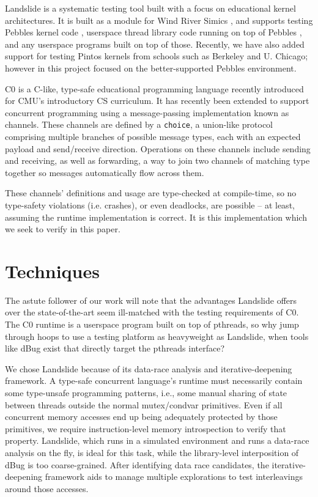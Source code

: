 \documentclass{article}
\begin{document}
Landslide \cite{landslide} is a systematic testing tool built with a focus on educational kernel architectures.
It is built as a module for Wind River Simics \cite{simics}, and supports testing Pebbles kernel code \cite{kspec}, userspace thread library code running on top of Pebbles \cite{thrlib}, and any userspace programs built on top of those.
Recently, we have also added support for testing Pintos kernels \cite{pintos} from schools such as Berkeley and U. Chicago; however in this project focused on the better-supported Pebbles environment.

C0 \cite{c0} is a C-like, type-safe educational programming language recently introduced for CMU's introductory CS curriculum.
It has recently been extended to support concurrent programming using a message-passing implementation known as channels.
These channels are defined by a {\tt choice}, a union-like protocol comprising multiple branches of possible message types, each with an expected payload and send/receive direction. Operations on these channels include sending and receiving, as well as forwarding, a way to join two channels of matching type together so messages automatically flow across them.

These channels' definitions and usage are type-checked at compile-time, so no type-safety violations (i.e. crashes), or even deadlocks, are possible -- at least, assuming the runtime implementation is correct. It is this implementation which we seek to verify in this paper.

\section{Techniques}

The astute follower of our work will note that the advantages Landslide offers over the state-of-the-art seem ill-matched with the testing requirements of C0. The C0 runtime is a userspace program built on top of pthreads, so why jump through hoops to use a testing platform as heavyweight as Landslide, when tools like dBug exist that directly target the pthreads interface?

We chose Landslide because of its data-race analysis and iterative-deepening framework.
A type-safe concurrent language's runtime must necessarily contain some type-unsafe programming patterns, i.e., some manual sharing of state between threads outside the normal mutex/condvar primitives.
Even if all concurrent memory accesses end up being adequately protected by those primitives, we require instruction-level memory introspection to verify that property.
Landslide, which runs in a simulated environment and runs a data-race analysis on the fly, is ideal for this task, while the library-level interposition of dBug is too coarse-grained.
After identifying data race candidates, the iterative-deepening framework aids to manage multiple explorations to test interleavings around those accesses.
\end{document}
